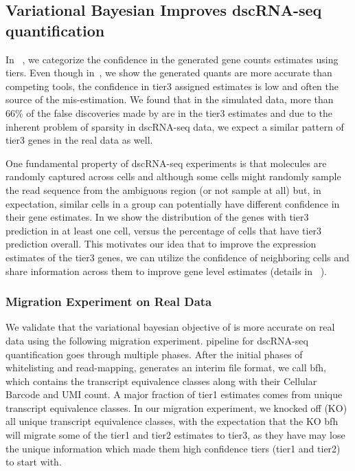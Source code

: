 \subsection{Variational Bayesian Improves dscRNA-seq quantification}
In ~, we categorize the confidence in the generated gene counts estimates using tiers. 
Even though in~, we show the \alevin generated quants are more accurate
than competing tools, the confidence in tier3 assigned estimates is low and often the source of 
the mis-estimation. We found that in the simulated data, more than 66\% of the false discoveries made 
by \alevin are in the tier3 estimates and due to the inherent problem of sparsity in dscRNA-seq data,
we expect a similar pattern of tier3 genes in the real data as well. 

One fundamental property of dscRNA-seq experiments is that molecules are randomly captured across cells 
and although some cells might randomly sample the read sequence from the ambiguous region 
(or not sample at all) but, in expectation, similar cells in a group can potentially have different 
confidence in their gene estimates. In  we show the distribution of the genes with tier3 
prediction in at least one cell, versus the percentage of cells that have tier3 prediction overall.
This motivates our idea that to improve the expression estimates of the tier3 genes, we can utilize the
confidence of neighboring cells and share information across them to improve gene level estimates 
(details in ~).

\subsubsection{Migration Experiment on Real Data}
We validate that the variational bayesian objective of \alevin is more accurate on real data using the
following migration experiment. \Alevin pipeline for dscRNA-seq quantification goes through multiple 
phases. After the initial phases of whitelisting and read-mapping, \alevin generates an interim 
file format, we call bfh, which contains the transcript equivalence classes along with their Cellular
Barcode and UMI count. A major fraction of tier1 estimates comes from unique transcript equivalence
classes. In our migration experiment, we knocked off (KO) all unique transcript equivalence classes, with
the expectation that the KO bfh will migrate some of the tier1 and tier2 estimates to tier3, as they have
may lose the unique information which made them high confidence tiers (tier1 and tier2) to start with. 

